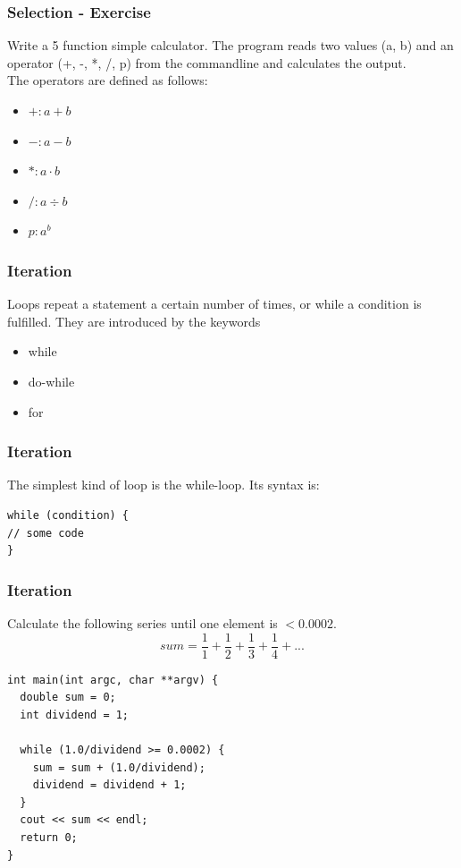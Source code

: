 \begin{frame}[fragile]
  \frametitle{Selection - Exercise}
  \begin{exercise}
  Write a 5 function simple calculator. The program reads two values (a, b) and
  an operator (+, -, *, /, p) from the commandline and calculates the output.\\
  The operators are defined as follows:
  \begin{itemize}
  \item $+: a+b$
  \item $-: a-b$
  \item $*: a\cdot b$
  \item $/: a \div b$
  \item $p: a^b$
  \end{itemize}
  \end{exercise}
\end{frame}


\begin{frame}[fragile]
  \frametitle{Iteration}
  Loops repeat a statement a certain number of times, or while a condition is fulfilled.
  They are introduced by the keywords
  \begin{itemize}
  \item while
  \item do-while
  \item for
  \end{itemize}
\end{frame}

\begin{frame}[fragile]
  \frametitle{Iteration}
  The simplest kind of loop is the while-loop. Its syntax is:
\begin{lstlisting}
while (condition) {
// some code
}
\end{lstlisting}
\end{frame}

\begin{frame}[fragile]
\frametitle{Iteration}
Calculate the following series until one element is $<0.0002$.
\begin{displaymath}
sum = \frac{1}{1} + \frac{1}{2} + \frac{1}{3} + \frac{1}{4} + ...
\end{displaymath}
{\tiny
\begin{lstlisting}
int main(int argc, char **argv) {
  double sum = 0;
  int dividend = 1;

  while (1.0/dividend >= 0.0002) {
    sum = sum + (1.0/dividend);
    dividend = dividend + 1;
  }
  cout << sum << endl;
  return 0;
}
\end{lstlisting}
}
\end{frame}


